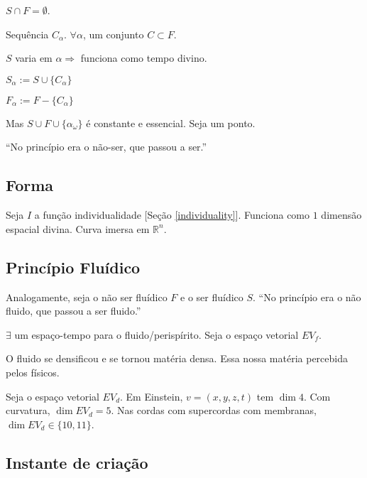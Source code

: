 \documentclass[12pt,a4paper]{article}
\begin{document}
			$S \cap F = \emptyset$.

			Sequ\^encia $C_\alpha$. $\forall \alpha$, um conjunto $C \subset F$.

			$S$ varia em $\alpha \Rightarrow$ funciona como tempo divino.

			$S_\alpha := S \cup \{C_\alpha\}$

			$F_\alpha := F - \{C_\alpha\}$

			Mas $S \cup F \cup \{\alpha_\omega\}$ \'e constante e essencial. Seja um ponto.

			\textquotedblleft No princ\'ipio era o n\~ao-ser, que passou a ser.\textquotedblright

			\subsection{Forma}

			\begin{flushright}
			\end{flushright}

			Seja $I$ a fun\c{c}\~ao individualidade [Se\c{c}\~ao \ref{individuality}]. Funciona como $1$ dimens\~ao espacial divina. Curva imersa em $\mathbb{R}^n$.

			\subsection{Princ\'ipio Flu\'idico}

			\begin{flushright}
			\end{flushright}

			Analogamente, seja o n\~ao ser flu\'idico $F$ e o ser flu\'idico $S$. \textquotedblleft No princ\'ipio era o n\~ao fluido, que passou a ser fluido.\textquotedblright

			$\exists$ um espa\c{c}o-tempo para o fluido/perisp\'irito. Seja o espa\c{c}o vetorial $EV_f$.

			O fluido se densificou e se tornou mat\'eria densa. Essa nossa mat\'eria percebida pelos f\'isicos.

			Seja o espa\c{c}o vetorial $EV_d$. Em Einstein, $v = (x,y,z,t)$ tem $\dim 4$. Com curvatura, $\dim EV_d = 5$. Nas cordas com supercordas com membranas, $\dim EV_d \in \{10, 11\}$.

			\subsection{Instante de cria\c{c}\~ao}
\end{document}
